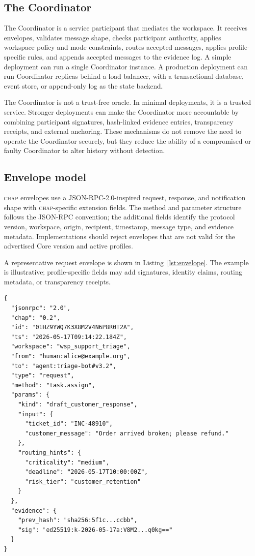 \documentclass[11pt]{article}
\newcommand{\chap}{\textsc{chap}}
\begin{document}
\subsection{The Coordinator}

The Coordinator is a service participant that mediates the workspace. It receives envelopes, validates message shape, checks participant authority, applies workspace policy and mode constraints, routes accepted messages, applies profile-specific rules, and appends accepted messages to the evidence log. A simple deployment can run a single Coordinator instance. A production deployment can run Coordinator replicas behind a load balancer, with a transactional database, event store, or append-only log as the state backend.

The Coordinator is not a trust-free oracle. In minimal deployments, it is a trusted service. Stronger deployments can make the Coordinator more accountable by combining participant signatures, hash-linked evidence entries, transparency receipts, and external anchoring. These mechanisms do not remove the need to operate the Coordinator securely, but they reduce the ability of a compromised or faulty Coordinator to alter history without detection.

\subsection{Envelope model}

\chap{} envelopes use a JSON-RPC-2.0-inspired request, response, and notification shape with \chap{}-specific extension fields. The method and parameter structure follows the JSON-RPC convention; the additional fields identify the protocol version, workspace, origin, recipient, timestamp, message type, and evidence metadata. Implementations should reject envelopes that are not valid for the advertised Core version and active profiles.

A representative request envelope is shown in Listing~\ref{lst:envelope}. The example is illustrative; profile-specific fields may add signatures, identity claims, routing metadata, or transparency receipts.

\begin{lstlisting}[caption={Representative \chap{} request envelope.},label={lst:envelope}]
{
  "jsonrpc": "2.0",
  "chap": "0.2",
  "id": "01HZ9YWQ7K3X8M2V4N6P8R0T2A",
  "ts": "2026-05-17T09:14:22.184Z",
  "workspace": "wsp_support_triage",
  "from": "human:alice@example.org",
  "to": "agent:triage-bot#v3.2",
  "type": "request",
  "method": "task.assign",
  "params": {
    "kind": "draft_customer_response",
    "input": {
      "ticket_id": "INC-48910",
      "customer_message": "Order arrived broken; please refund."
    },
    "routing_hints": {
      "criticality": "medium",
      "deadline": "2026-05-17T10:00:00Z",
      "risk_tier": "customer_retention"
    }
  },
  "evidence": {
    "prev_hash": "sha256:5f1c...ccbb",
    "sig": "ed25519:k-2026-05-17a:V8M2...q0kg=="
  }
}
\end{lstlisting}
\end{document}
